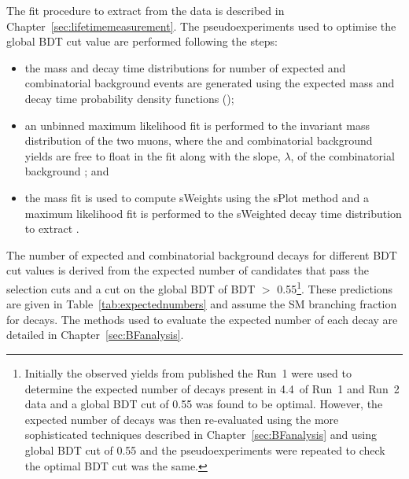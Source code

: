 The fit procedure to extract \tmumu from the data is described in Chapter~\ref{sec:lifetimemeasurement}. The pseudoexperiments used to optimise the global BDT cut value are performed following the steps:
\begin{itemize}
\item the mass and decay time distributions for number of expected \bsmumu and combinatorial background events are generated using the expected mass and decay time probability density functions (\pdfs);
\item an unbinned maximum likelihood fit is performed to the invariant mass distribution of the two muons, where the \bsmumu and combinatorial background yields are free to float in the fit along with the slope, $\lambda$, of the combinatorial background \pdf; and 
\item the mass fit is used to compute sWeights using the sPlot method \cite{Pivk:2004ty} and a maximum likelihood fit is performed to the sWeighted decay time distribution to extract \tmumu. 
\end{itemize}

The number of expected \bsmumu and combinatorial background decays for different BDT cut values is derived from the expected number of candidates that pass the \el selection cuts and a cut on the global BDT of BDT $>$ 0.55\footnote{Initially the observed yields from published the Run~1 \BFm were used to determine the expected number of decays present in 4.4~\fb of Run~1 and Run~2 data and a global BDT cut of 0.55 was found to be optimal. However, the expected number of decays was then re-evaluated using the more sophisticated techniques described in Chapter~\ref{sec:BFanalysis} and using global BDT cut of 0.55 and the pseudoexperiments were repeated to check the optimal BDT cut was the same.}. %
These predictions are given in Table~\ref{tab:expectednumbers} and assume the SM branching fraction for \bsmumu decays. %
The methods used to evaluate the expected number of each decay are detailed in Chapter~\ref{sec:BFanalysis}. 

